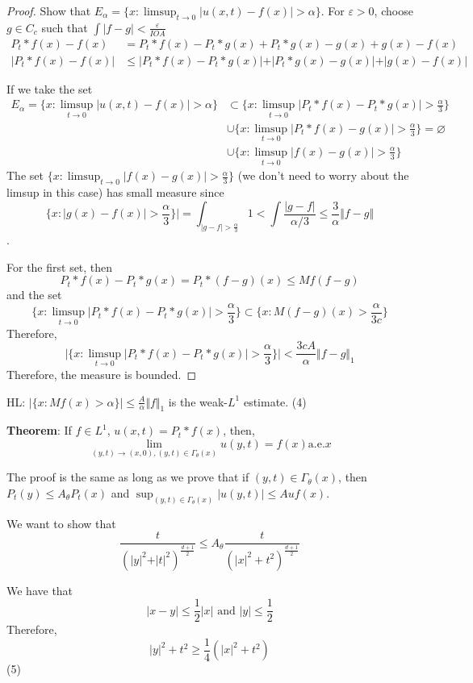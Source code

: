 \documentclass[12pt]{article}
\let\emptyset\varnothing
\begin{document}
\begin{proof}
Show that $E_\alpha = \{ x : \limsup_{t \rightarrow 0} \vert u(x,t) - f(x) \vert > \alpha\}$. For $\varepsilon>0$, choose $g \in C_c$ such that $\int \vert f-g \vert < \frac{\varepsilon}{IOA}$
\begin{align*}
P_t*f(x) - f(x) &= P_t * f(x) - P_t*g(x) + P_t*g(x)-g(x)+g(x)-f(x) \\
\vert P_t*f(x) - f(x)\vert  &\leq \vert P_t * f(x) - P_t*g(x)\vert  + \vert P_t*g(x)-g(x)\vert +\vert g(x)-f(x)\vert 
\end{align*}

If we take the set 
\begin{align*}
E_\alpha = \{ x : \limsup_{t \rightarrow 0} \vert u(x,t) - f(x) \vert > \alpha\} &\subset \{ x : \limsup_{t \rightarrow 0} \vert P_t*f(x) - P_t*g(x) \vert > \frac{\alpha}{3}\} \\
&\cup \{ x : \limsup_{t \rightarrow 0} \vert P_t*f(x) - g(x) \vert > \frac{\alpha}{3}\}=\emptyset \\
&\cup \{ x : \limsup_{t \rightarrow 0} \vert f(x) - g(x) \vert > \frac{\alpha}{3}\}
\end{align*}
The set $\{ x : \limsup_{t \rightarrow 0} \vert f(x) - g(x) \vert > \frac{\alpha}{3}\}$ (we don't need to worry about the limsup in this case) has small measure since $$\{x : \vert g(x) - f(x) \vert > \frac{\alpha}{3} \} \vert = \int_{\vert g-f\vert > \frac{\alpha}{3}} 1 < \int \frac{\vert g-f\vert}{\alpha/3} \leq \frac{3}{\alpha} \Vert f-g\Vert$$.

For the first set, then 
$$P_t*f(x) - P_t*g(x) = P_t*(f-g)(x) \leq Mf(f-g)$$
and the set
$$\{ x : \limsup_{t\rightarrow 0} \vert P_t*f(x) - P_t*g(x) \vert > \frac{\alpha}{3}\} \subset \{x: M(f-g)(x) > \frac{\alpha}{3c}\}$$
Therefore, 
$$\vert \{ x: \limsup_{t\rightarrow 0} \vert P_t*f(x) - P_t*g(x) \vert > \frac{\alpha}{3}\} \vert < \frac{3cA}{\alpha} \Vert f-g \Vert_1$$
Therefore, the measure is bounded. 
\end{proof}

\noindent HL: $\vert \{x: Mf(x) > \alpha\} \vert \leq \frac{A}{\alpha}\Vert f\Vert_1$ is the weak-$L^1$ estimate. 
(4)

\textbf{Theorem}: If $f \in L^1$, $u(x,t) = P_t * f(x)$, then, 
$$ \lim_{(y,t) \rightarrow (x,0), (y,t) \in \Gamma_\theta(x)} u(y,t) = f(x) \text{a.e.} x$$

The proof is the same as long as we prove that if $(y,t) \in \Gamma_\theta(x)$, then $P_t(y) \leq A_\theta P_t(x)$ and $\sup_{(y,t) \in \Gamma_\theta (x)} \vert u(y,t) \vert \leq  A uf(x)$. 

We want to show that 
$$\frac{t}{(\vert y \vert^2 + \vert t \vert^2)^{\frac{d+1}{2}}} \leq A_\theta \frac{t}{(\vert x \vert^2 + t^2)^{\frac{d+1}{2}}} $$

We have that 
$$\vert x - y \vert \leq \frac{1}{2} \vert x \vert \text{ and } \vert y \vert \leq \frac{1}{2} $$
Therefore, $$\vert y \vert^2 + t^2 \geq \frac{1}{4} (\vert x \vert^2 + t^2)$$
(5)
\end{document}
